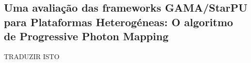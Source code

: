 \documentclass[main.tex]{subfiles}
\begin{document}
\cleardoublepage
{}
{}
\chapter*{\abstractname}
  \section*{Uma avaliação das frameworks GAMA/StarPU para Plataformas Heterogéneas: O algoritmo de Progressive Photon Mapping}

  TRADUZIR ISTO
\end{document}
